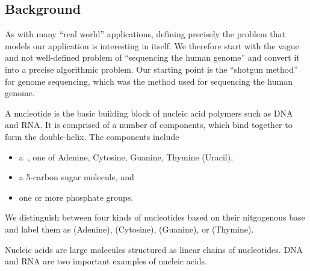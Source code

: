 \subsection{Background}


\begin{gram}


As with many ``real world'' applications, defining precisely the
problem that models our application is interesting in itself.  
%
We
therefore start with the vague and not well-defined problem of
``sequencing the human genome'' and convert it into a precise
algorithmic problem.  
%
Our starting point is the ``shotgun method'' for
genome sequencing, which was the method used for sequencing the human
genome.
\end{gram}


\begin{definition}[Nucleotide]
A nucleotide is the basic building block of nucleic acid polymers such
as DNA and RNA. 
%
It is comprised of a number of components, which bind together to form
the double-helix.
%
The components include 
\begin{itemize}
\item a~, one of Adenine,
Cytosine, Guanine, Thymine (Uracil), 

\item a 5-carbon sugar molecule, and
\item one or more phosphate groups.
\end{itemize}
%
We distinguish between four kinds of nucleotides based on their
nitgogenous base and label them as  (Adenine), 
(Cytosine),  (Guanine), or  (Thymine).
\end{definition}

\begin{definition}
Nucleic acids are large molecules structured as linear chains of
nucleotides.  DNA and RNA are two important examples of nucleic acids.
\end{definition}

